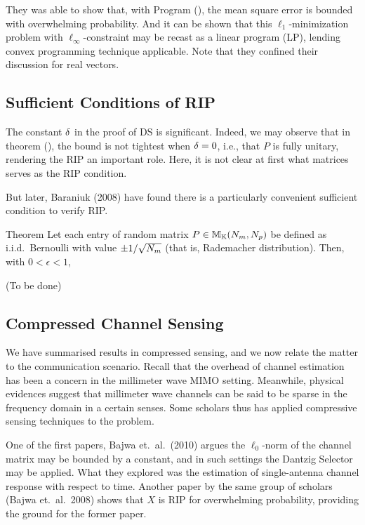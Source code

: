 They was able to show that, with Program (), the mean square error is bounded with overwhelming probability.
And it can be shown that this \(\ell_1\)-minimization problem with \(\ell_\infty\)-constraint may be recast as a linear program (LP), lending convex programming technique applicable.
Note that they confined their discussion for real vectors.

\subsection{Sufficient Conditions of RIP}

The constant \(\delta\) in the proof of DS is significant.
Indeed, we may observe that in theorem (), the bound is not tightest when \(\delta=0\), i.e., that \(P\) is fully unitary, rendering the RIP an important role.
Here, it is not clear at first what matrices serves as the RIP condition.

But later, Baraniuk (2008) have found there is a particularly convenient sufficient condition to verify RIP.

\Result
{Theorem}
{
Let each entry of random matrix \(P \in \mathbb{M}_{\mathbb{K}} (N_m, N_p)\) be defined as i.i.d.\ Bernoulli with value \(\pm 1/\sqrt{N_m}\) (that is, Rademacher distribution).
Then, with \(0 <\epsilon <1\),
%
}

{ \color{red} (To be done) }

\subsection{Compressed Channel Sensing}

We have summarised results in compressed sensing, and we now relate the matter to the communication scenario.
Recall that the overhead of channel estimation has been a concern in the millimeter wave MIMO setting.
Meanwhile, physical evidences suggest that millimeter wave channels can be said to be sparse in the frequency domain in a certain senses.
Some scholars thus has applied compressive sensing techniques to the problem.

One of the first papers, Bajwa et.\ al.\ (2010) argues the \(\ell_0\)-norm of the channel matrix may be bounded by a constant, and in such settings the Dantzig Selector may be applied.
What they explored was the estimation of single-antenna channel response with respect to time.
Another paper by the same group of scholars (Bajwa et.\ al.\ 2008) shows that \(X\) is RIP for overwhelming probability, providing the ground for the former paper.

